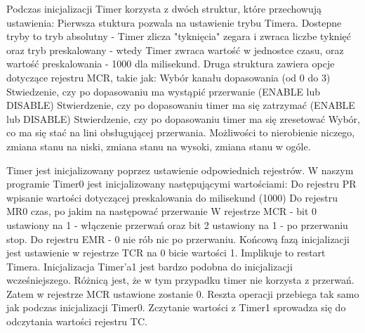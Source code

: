 \documentclass{classrep}
\begin{document}
		
		Podczas inicjalizacji Timer korzysta z dwóch struktur, które przechowują ustawienia:
		\newline
		\textbullet Pierwsza stuktura pozwala na ustawienie trybu Timera. Dostepne tryby to tryb absolutny - Timer zlicza "tyknięcia" zegara i zwraca liczbe tyknięć oraz tryb preskalowany - wtedy Timer zwraca wartość w jednostce czasu, oraz wartość preskalowania - 1000 dla milisekund.
		\newline
		\textbullet Druga struktura zawiera opcje dotyczące rejestru MCR, takie  jak:
			\newline \textbullet Wybór kanału dopasowania (od 0 do 3)
			\newline \textbullet Stwiedzenie, czy po dopasowaniu ma wystąpić przerwanie (ENABLE lub DISABLE)
			\newline \textbullet Stwierdzenie, czy po dopasowaniu timer ma się zatrzymać (ENABLE lub DISABLE)
			\newline \textbullet Stwierdzenie, czy po dopasowaniu timer ma się zresetować  
			\newline \textbullet Wybór, co ma się stać na lini obsługującej przerwania. Możliwości to nierobienie niczego, zmiana stanu na niski, zmiana stanu na wysoki, zmiana stanu w ogóle.
			
		 Timer jest inicjalizowany poprzez ustawienie odpowiednich rejestrów. W naszym programie Timer0 jest inicjalizowany następującymi wartościami:
		\newline \textendash Do rejestru PR wpisanie wartości dotyczącej preskalowania do milisekund (1000)
		\newline \textendash Do rejestru MR0 czas, po jakim na następować przerwanie
		\newline \textendash W rejestrze MCR - bit 0 ustawiony na 1 - włączenie przerwań oraz bit 2 ustawiony na 1 - po przerwaniu stop.
		\newline \textendash Do rejestru EMR - 0 nie rób nic po przerwaniu.
		\newline \textendash Końcową fazą inicjalizacji jest ustawienie w rejestrze TCR na 0 bicie wartości 1. Implikuje to restart Timera.	
		\newline Inicjalizacja Timer'a1 jest bardzo podobna do inicjalizacji wcześniejszego. Różnicą jest, że w tym przypadku timer nie korzysta z przerwań. Zatem w rejestrze MCR ustawione zostanie 0. Reszta operacji przebiega tak samo jak podczas inicjalizacji Timer0.
		\newline \newline
		Zczytanie wartości z Timer1 sprowadza się do odczytania wartości rejestru TC.
		
\end{document}
